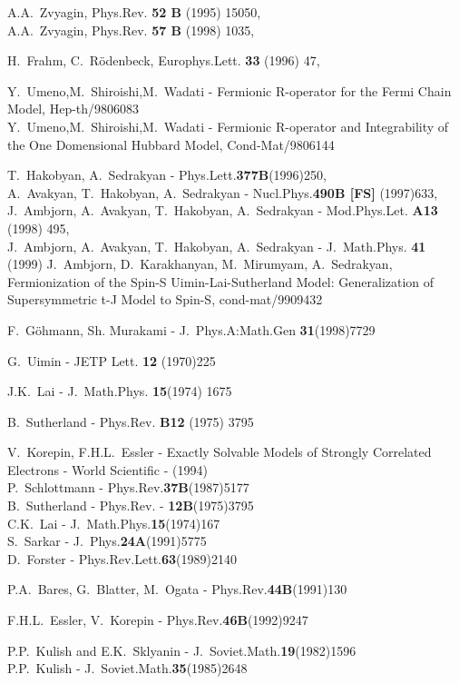 \documentclass[a4paper,12pt]{article}
\begin{document}
\begin{thebibliography}{10}
 A.A.~Zvyagin, Phys.Rev. {\bf 52 B} (1995) 15050,\\
            A.A.~Zvyagin, Phys.Rev. {\bf 57 B} (1998) 1035,

 H.~Frahm, C.~R{\"o}denbeck, Europhys.Lett. {\bf
     33} (1996) 47,






 Y.~Umeno,M.~Shiroishi,M.~Wadati - Fermionic R-operator for the Fermi
               Chain Model, Hep-th/9806083\\
              Y.~Umeno,M.~Shiroishi,M.~Wadati - Fermionic R-operator and 
               Integrability of the One Domensional Hubbard Model,
               Cond-Mat/9806144

 T.~Hakobyan, A.~Sedrakyan  - Phys.Lett.{\bf 377B}(1996)250,\\
             A.~Avakyan, T.~Hakobyan, A.~Sedrakyan  - Nucl.Phys.{\bf 490B [FS]} 
              (1997)633, \\
              J.~Ambjorn, A.~Avakyan, T.~Hakobyan, A.~Sedrakyan - Mod.Phys.Let.
              {\bf A13 }(1998) 495,\\
              J.~Ambjorn, A.~Avakyan, T.~Hakobyan, A.~Sedrakyan - 
              J.~Math.Phys. {\bf 41} (1999)
 J.~Ambjorn, D.~Karakhanyan, M.~Mirumyam, A.~Sedrakyan, Fermionization
         of the Spin-S Uimin-Lai-Sutherland Model: Generalization of 
          Supersymmetric t-J Model to Spin-S, cond-mat/9909432

  F.~G\"ohmann, Sh. Murakami - J.~Phys.A:Math.Gen {\bf 31}(1998)7729


 G.~Uimin -  JETP Lett. {\bf 12} (1970)225

 J.K.~Lai -  J.~Math.Phys. {\bf 15}(1974) 1675

 B.~Sutherland -  Phys.Rev. {\bf B12} (1975) 3795






V.~Korepin, F.H.L.~Essler - Exactly Solvable Models of Strongly 
             Correlated Electrons - World Scientific - (1994)\\
             P.~Schlottmann - Phys.Rev.{\bf 37B}(1987)5177\\
             B.~Sutherland - Phys.Rev. - {\bf 12B}(1975)3795\\
             C.K.~Lai - J.~Math.Phys.{\bf 15}(1974)167\\ 
             S.~Sarkar - J.~Phys.{\bf 24A}(1991)5775\\
             D.~Forster - Phys.Rev.Lett.{\bf 63}(1989)2140 

 P.A.~Bares, G.~Blatter, M.~Ogata - Phys.Rev.{\bf 44B}(1991)130
             
F.H.L.~Essler, V.~Korepin - Phys.Rev.{\bf 46B}(1992)9247  

  P.P.~Kulish and E.K.~Sklyanin - J.~Soviet.Math.{\bf 19}(1982)1596\\ 
              P.P.~Kulish - J.~Soviet.Math.{\bf 35}(1985)2648




\end{thebibliography}
\end{document}
